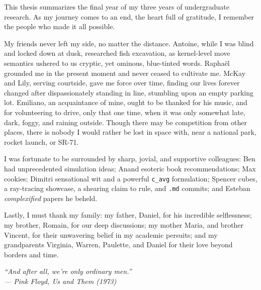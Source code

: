 
\vspace{0.35cm}

\noindent This thesis summarizes the final year of my three years of undergraduate research.
As my journey comes to an end, the heart full of gratitude, I remember the people who made
it all possible.

My friends never left my side, no matter the distance. Antoine, while I was blind
and locked down at dusk, researched fish excavation, as kernel-level move semantics
ushered to us cryptic, yet ominous, blue-tinted words.
%
Raphaël grounded me in the present moment and never ceased to cultivate me.
%
McKay and Lily, serving courtside, gave me force over time, finding our
lives forever changed after dispassionately standing in line, stumbling upon an empty
parking lot.
%
Emiliano, an acquaintance of mine, ought to be thanked for his music, and for
volunteering to drive, only that one time, when it was only somewhat late,
dark, foggy, and raining outside. Though there may be competition from other
places, there is nobody I would rather be lost in space with, near a national park,
rocket launch, or SR-71.

I was fortunate to be surrounded by sharp, jovial, and supportive colleagues:
Ben had unprecedented simulation ideas;
Anand esoteric book recommendations;
Max cookies;
Dimitri sensational wit and a powerful \verb|c_avg| formulation;
Spencer cubes, a ray-tracing showcase, a shearing claim to rule, and \verb|.md| commits;
and Esteban \textit{complexified} papers he beheld.

Lastly, I must thank my family:
my father, Daniel, for his incredible selflessness;
my brother, Romain, for our deep discussions;
my mother Maria, and brother Vincent, for their unwavering belief in my academic persuits;
and my grandparents Virginia, Warren, Paulette, and Daniel for their love beyond
borders and time.

\renewcommand{\arraystretch}{1.2}

\vspace*{\fill}

\vspace{1cm}
\begin{center}
\textit{``And after all, we're only ordinary men.''} \\
\textit{--- Pink Floyd, Us and Them (1973)}
\end{center}
\vspace{1cm}

\vspace*{\fill}